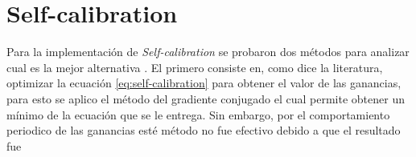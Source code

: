 \chapter{Self-calibration}
\label{cap:selfcalibration}

\begin{comment}
La síntesis de imágenes en radio-interferometría permite generar mapas (imágenes) de ondas de radio emitidas del cielo, las cuales son capturadas por un conjunto de antenas. Sin embargo, estos datos son corrompidos por distintos factores como las distorsiones atmosféricas. Este ruido se presenta como un factor complejo y constante que multiplica la señal recibida de cada antena. Sin embargo, el proceso de auto-calibracion o \textit{self-calibration} permite disminuir este factor, o también denominado ganancias, a través de un ciclo iterativo donde se crea una imagen con los datos actuales, se encuentra las ganancias asociadas a esta y se dividen los datos por las ganancias estimadas, volviendo al paso de generación de imagen de ser necesario. Aunque en el primer paso de \textit{self-calibration} se considere la síntesis de imágenes, este en si es un problema indeterminado o mal puesto debido a que la transformación que va desde el plano de la imagen hasta los datos es altamente no invertible, por lo que una infinidad de imágenes cumple con los datos recibidos. Sin embargo, existen métodos que permiten la generación del mapa como CLEAN o MEM pero son altamente sensibles al factor multiplicativo. Aunque una técnica reciente denominada \textit{bispectrum} permite generar mapas de los datos sin verse afectado por el factor multiplicativo, siendo una posible alternativa para efectuar el proceso de calibración. En este trabajo se propone efectuar una calibración mediante \textit{self-calibration} y síntesis de imágenes utilizando \textit{bispectrum} además de otras regularizaciones. Esto con el objetivo de responder la pregunta si el método de \textit{bispectrum} es la mejor opción para calibrar. Para esto se experimenta con diferentes simulaciones de datos, imágenes y métodos de síntesis para comparar y evaluar quien genera la mejor calibración. 
\end{comment}


Para la implementación de \textit{Self-calibration}  se probaron dos métodos para analizar cual es la mejor alternativa . El primero consiste en, como dice la literatura, optimizar la ecuación \ref{eq:self-calibration} para obtener el valor de las ganancias, para esto se aplico el método del gradiente conjugado el cual permite obtener un mínimo de la ecuación que se le entrega. Sin embargo, por el comportamiento periodico de las ganancias esté método no fue efectivo debido a que el resultado fue 

